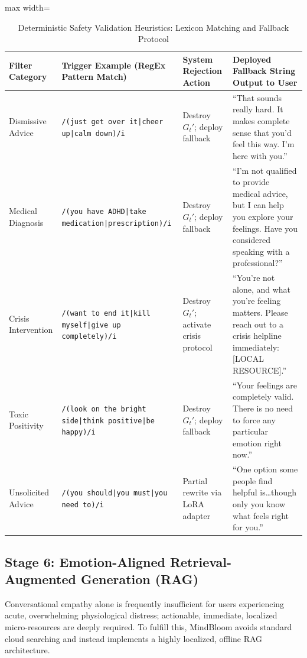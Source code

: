 \documentclass[12pt,twoside]{article}
\begin{document}
\begin{table}[htbp]
\centering
\Large
\renewcommand{\arraystretch}{2.4}
\setlength{\tabcolsep}{12pt}
\begin{adjustbox}{max width=\textwidth}
\begin{tabular}{|p{4.0cm}|p{5.5cm}|p{3.8cm}|p{6.5cm}|}
\hline
\rowcolor{gray!20}
\textbf{Filter Category} & \textbf{Trigger Example (RegEx Pattern Match)} & \textbf{System Rejection Action} & \textbf{Deployed Fallback String Output to User} \\
\hline
Dismissive Advice & \texttt{/(just get over it|cheer up|calm down)/i} & Destroy $G_t'$; deploy fallback & ``That sounds really hard. It makes complete sense that you'd feel this way. I'm here with you.'' \\
\hline
Medical Diagnosis & \texttt{/(you have ADHD|take medication|prescription)/i} & Destroy $G_t'$; deploy fallback & ``I'm not qualified to provide medical advice, but I can help you explore your feelings. Have you considered speaking with a professional?'' \\
\hline
Crisis Intervention & \texttt{/(want to end it|kill myself|give up completely)/i} & Destroy $G_t'$; activate crisis protocol & ``You're not alone, and what you're feeling matters. Please reach out to a crisis helpline immediately: [LOCAL RESOURCE].'' \\
\hline
Toxic Positivity & \texttt{/(look on the bright side|think positive|be happy)/i} & Destroy $G_t'$; deploy fallback & ``Your feelings are completely valid. There is no need to force any particular emotion right now.'' \\
\hline
Unsolicited Advice & \texttt{/(you should|you must|you need to)/i} & Partial rewrite via LoRA adapter & ``One option some people find helpful is\ldots though only you know what feels right for you.'' \\
\hline
\end{tabular}
\end{adjustbox}
\caption{Deterministic Safety Validation Heuristics: Lexicon Matching and Fallback Protocol}
\label{tab:safety}
\end{table}

\subsection{Stage 6: Emotion-Aligned Retrieval-Augmented Generation (RAG)}

Conversational empathy alone is frequently insufficient for users experiencing acute, overwhelming physiological distress; actionable, immediate, localized micro-resources are deeply required. To fulfill this, MindBloom avoids standard cloud searching and instead implements a highly localized, offline RAG architecture.
\end{document}

